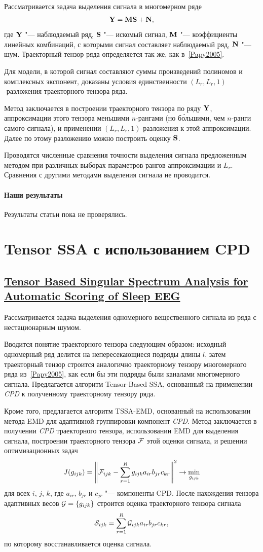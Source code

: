 \documentclass[12pt]{article}
\theoremstyle{plain}
\theoremstyle{definition}
\theoremstyle{remark}
\newcommand{\CPD}{\emph{CPD}}
\begin{document}
Рассматривается задача выделения сигнала в многомерном ряде
\[
  \mathbf{Y} = \mathbf{M} \mathbf{S} + \mathbf{N},
\]
где $\mathbf{Y}$ "--- наблюдаемый ряд, $\mathbf{S}$ "--- искомый сигнал, $\mathbf{M}$
"--- коэффициенты линейных комбинаций, с которыми сигнал составляет
наблюдаемый ряд, $\mathbf{N}$ "--- шум.
Траекторный тензор ряда определяется так же, как в~\ref{Papy2005}.

Для модели, в которой сигнал составляют суммы произведений полиномов
и комплексных экспонент, доказаны условия единственности $(L_r, L_r,
1)$-разложения траекторного тензора ряда.

Метод заключается в построении траекторного тензора по ряду $\mathbf{Y}$,
аппроксимации этого тензора меньшими $n$-рангами (но б\'{о}льшими, чем
$n$-ранги самого сигнала), и применении $(L_r, L_r, 1)$-разложения к
этой аппроксимации.
Далее по этому разложению можно построить оценку $\mathbf{S}$.

Проводятся численные сравнения точности выделения сигнала
предложенным методом при различных выборах параметров рангов
аппроксимации и $L_r$.
Сравнения с другими методами выделения сигнала не проводится.

\paragraph{Наши результаты} Результаты статьи пока не проверялись.

\section{Tensor SSA с использованием CPD}
\subsection{\href{https://doi.org/10.1109/tnsre.2014.2329557}{Tensor
    Based Singular Spectrum Analysis for Automatic Scor\-ing of Sleep
EEG}}\label{Kouchaki2015}
Рассматривается задача выделения одномерного вещественного сигнала
из ряда с нестационарным шумом.

Вводится понятие траекторного тензора следующим образом: исходный
одномерный ряд делится на непересекающиеся подряды длины $l$, затем
траекторный тензор строится аналогично траекторному тензору
многомерного ряда из~\ref{Papy2005}, как если бы эти подряды были
каналами многомерного сигнала.
Предлагается алгоритм Tensor-Based SSA, основанный на применении \CPD{}
к полученному траекторному тензору ряда.

Кроме того, предлагается алгоритм TSSA-EMD, основанный на
использовании метода
EMD для адаптивной группировки компонент \CPD{}.
Метод заключается в получении \CPD{} траекторного тензора, использовании
EMD для выделения сигнала, построении траекторного тензора $\mathcal{F}$
этой оценки сигнала, и решении оптимизационных задач
\[
  J(g_{ijk}) = \left\|\mathcal{F}_{ijk} - \sum_{r=1}^{R}g_{ijk} a_{ir} b_{jr}
  c_{kr}\right\|^2 \to \min_{g_{ijk}}
\]
для всех $i$, $j$, $k$, где $a_{ir}$, $b_{jr}$ и $c_{jr}$ "--- компоненты CPD.
После нахождения тензора адаптивных весов $\mathcal{G}=\{g_{ijk}\}$ строится оценка
траекторного тензора сигнала
\[
  \mathcal{S}_{ijk} = \sum_{r=1}^{R}\mathcal{G}_{ijk} a_{ir} b_{jr} c_{kr},
\]
по которому восстанавливается оценка сигнала.
\end{document}
